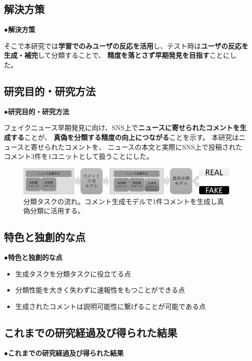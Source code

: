 {	\subsection{解決方策}
	\noindent
	●\textbf{解決方策}

	そこで本研究では\textbf{学習でのみユーザの反応を活用}し、テスト時は\textbf{ユーザの反応を生成・補完}して分類することで、
	\textbf{精度を落とさず早期発見を目指す}ことにした。

	\subsection{研究目的・研究方法}
	\noindent
	●\textbf{研究目的・研究方法}

	フェイクニュース早期発見に向け、SNS上で\textbf{ニュースに寄せられたコメントを生成する}ことが、
	\textbf{真偽を分類する精度の向上につながる}ことを示す。
	本研究はニュースと寄せられたコメントを、
	ニュースの本文と実際にSNS上で投稿されたコメント3件を1ユニットとして扱うことにした。
	
	\begin{figure}[ht]
		\centering
		\includegraphics[width=0.95\linewidth]{model.pdf}
		\caption{分類タスクの流れ。コメント生成モデルで1件コメントを生成し真偽分類に活用する。}
		\label{fig:model}
	\end{figure}

	\subsection{特色と独創的な点}
	\noindent
	●\textbf{特色と独創的な点}
	
	\begin{itemize}
		\item 生成タスクを分類タスクに役立てる点
		\item 分類性能を大きく失わずに速報性をもつことができる点
		\item 生成されたコメントは説明可能性に繋げることが可能である点
	\end{itemize}

	\subsection{これまでの研究経過及び得られた結果}
	\noindent
	●\textbf{これまでの研究経過及び得られた結果}

}
